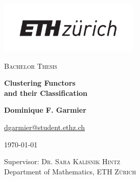 \begin{titlepage}
\begin{center}
\vspace{1cm}
\includegraphics[width=0.5\textwidth]{assets/logo.pdf}\\
\vspace{1cm}


\textsc{Bachelor Thesis}

\vspace{1cm}

{\huge \textbf{Clustering Functors \\[0.5em] and their Classification}}

\vspace{1cm}
\textbf{Dominique F. Garmier}
       
\vspace{0.15cm}
       
\href{mailto:dgarmier@student.ethz.ch}{dgarmier@student.ethz.ch}

\vspace{0.25cm}

\today

\vfill
            
\vspace{0.8cm}
     
Supervisor: \textsc{Dr. Sara Kalisnik Hintz}\\
Department of Mathematics, \textsc{ETH Zürich}\\
       
\end{center}
\end{titlepage}
